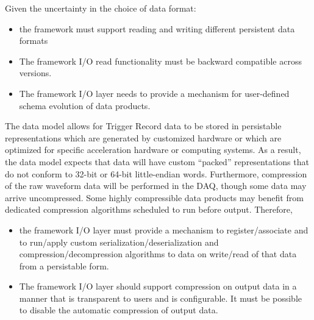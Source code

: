 \documentclass[../main-v1.tex]{subfiles}
\begin{document}
Given the uncertainty in the choice of data format:

\begin{itemize}
\item  the framework must support reading and writing different persistent data formats


\item The framework I/O read functionality must be backward compatible across versions.



\item The framework I/O layer needs to provide a mechanism for user-defined schema evolution of data products.
\end{itemize}
The  data model allows for Trigger Record data to be stored in persistable representations which are generated by customized hardware or which are optimized for specific acceleration hardware or computing systems.  As a result, the data model expects that data will have custom “packed” representations that do not conform to 32-bit or 64-bit little-endian words. Furthermore, compression of the raw waveform data will be performed in the DAQ, though some data may arrive uncompressed.  Some highly compressible data products may benefit from dedicated compression algorithms scheduled to run before output. Therefore, 

\begin{itemize}
\item the framework I/O layer must provide a mechanism to register/associate and to run/apply custom serialization/deserialization and compression/decompression algorithms to data on write/read of that data from a persistable form.  


\item The framework I/O layer should support compression on output data in a manner that is transparent to users and is configurable.  It must be possible to disable the automatic compression of output data.
\end{itemize}
\end{document}
